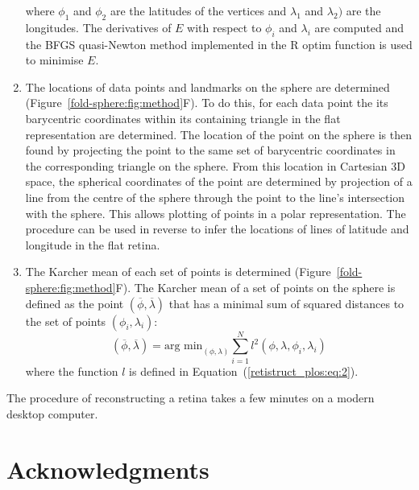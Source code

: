 \documentclass[10pt]{article}
\begin{document}
\begin{enumerate}
  where $\phi_1$ and $\phi_2$ are the latitudes of the vertices and
  $\lambda_1$ and $\lambda_2)$ are the longitudes.  The derivatives of
  $E$ with respect to $\phi_i$ and $\lambda_i$ are computed and the
  BFGS quasi-Newton method implemented in the R optim function is used
  to minimise $E$.
\item The locations of data points and landmarks on the sphere are
  determined (Figure~\ref{fold-sphere:fig:method}F). To do this, for
  each data point the its barycentric coordinates within its containing
  triangle in the flat representation are determined.  The location of
  the point on the sphere is then found by projecting the point to the
  same set of barycentric coordinates in the corresponding triangle on
  the sphere. From this location in Cartesian 3D space, the spherical
  coordinates of the point are determined by projection of a line from
  the centre of the sphere through the point to the line's
  intersection with the sphere. This allows plotting of points in a
  polar representation. The procedure can be used in reverse to infer
  the locations of lines of latitude and longitude in the flat
  retina.
\item The Karcher mean of each set of points is determined
  (Figure~\ref{fold-sphere:fig:method}F). The Karcher mean of a set of
  points on the sphere \cite{Karc77riem,HeoSmal06form} is defined as
  the point $(\overline{\phi}, \overline{\lambda})$ that has a minimal
  sum of squared distances to the set of points $(\phi_i, \lambda_i)$:
  \begin{equation}
    \label{retistruct_plos:eq:3}
    (\overline{\phi}, \overline{\lambda}) = \mbox{arg min}_{(\phi,
      \lambda)} \sum_{i=1}^N l^2(\phi, \lambda, \phi_i, \lambda_i)
  \end{equation}
  where the function $l$ is defined in
  Equation~(\ref{retistruct_plos:eq:2}).
\end{enumerate}

The procedure of reconstructing a retina takes a few minutes on a
modern desktop computer.

\section*{Acknowledgments}



%
\end{document}
